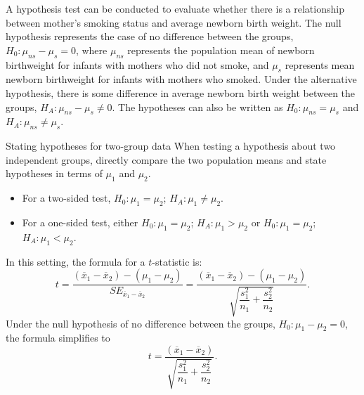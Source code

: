 A hypothesis test can be conducted to evaluate whether there is a relationship between mother's smoking status and average newborn birth weight. The null hypothesis represents the case of no difference between the groups, $H_0: \mu_{ns} - \mu_{s} = 0$, where $\mu_{ns}$ represents the population mean of newborn birthweight for infants with mothers who did not smoke, and $\mu_s$ represents mean newborn birthweight for infants with mothers who smoked. Under the alternative hypothesis, there is some difference in average newborn birth weight between the groups, $H_A: \mu_{ns} - \mu_{s} \neq 0$. The hypotheses can also be written as $H_0: \mu_{ns} = \mu_{s}$ and $H_A: \mu_{ns} \neq \mu_{s}$.

\begin{onebox}{Stating hypotheses for two-group data}
When testing a hypothesis about two independent groups, directly compare the two population means and state hypotheses in terms of $\mu_1$ and $\mu_2$.
\begin{itemize}
	\item For a two-sided test, $H_0: \mu_{1} = \mu_{2}$; $H_A: \mu_{1} \neq \mu_{2}$.
	\item For a one-sided test, either $H_0: \mu_{1} = \mu_{2}$; $H_A: \mu_{1} > \mu_{2}$ or  $H_0: \mu_{1} = \mu_{2}$; $H_A: \mu_{1} < \mu_{2}$.
\end{itemize}
\end{onebox}



In this setting, the formula for a $t$-statistic is:
\[
t = \dfrac{(\overline{x}_1 - \overline{x}_2) - (\mu_1 - \mu_2)}{SE_{\overline{x}_{1} - \overline{x}_{2}}} = \dfrac{(\overline{x}_1 - \overline{x}_2) - (\mu_1 - \mu_2)}{\sqrt{\dfrac{s_{1}^{2}}{n_1} + \dfrac{s_{2}^{2}}{n_2}}}.
\]
Under the null hypothesis of no difference between the groups, $H_0: \mu_{1} - \mu_{2} = 0$, the formula simplifies to
\[t = \dfrac{(\overline{x}_1 - \overline{x}_2)}{\sqrt{\dfrac{s_{1}^{2}}{n_1} + \dfrac{s_{2}^{2}}{n_2}}}.\]


